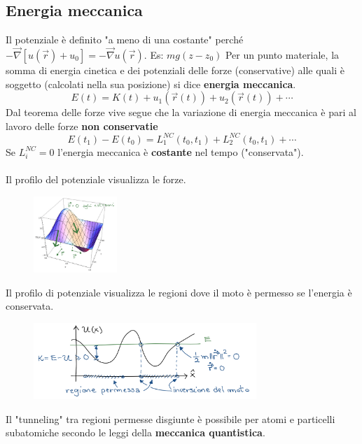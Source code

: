 \subsection{Energia meccanica}
\hspace{-15pt}Il potenziale è definito "a meno di una costante" perché $-\vec{\nabla}[u(\vec{r}) + u_0] = -\vec{\nabla}u(\vec{r})$. Es: $mg(z-z_0)$
Per un punto materiale, la somma di energia cinetica e dei potenziali delle forze (conservative) alle quali è soggetto (calcolati nella sua posizione) si 
dice \textbf{energia meccanica}.
$$E(t) = K(t) + u_1(\vec{r}(t)) + u_2(\vec{r}(t)) + \cdots$$
Dal teorema delle forze vive segue che la variazione di energia meccanica è pari al lavoro delle forze \textbf{non conservatie}
$$E(t_1) - E(t_0) = L_1^{NC}(t_0, t_1) + L_2^{NC}(t_0, t_1) + \cdots$$
Se $L_i^{NC} = 0$ l'energia meccanica è \textbf{costante} nel tempo ("conservata").\\\\
Il profilo del potenziale visualizza le forze.
\begin{figure}[h!]
    \centering
    \includegraphics[width=0.28\textwidth]{images/profilo-potenziale.png}
\end{figure}
\newpage
Il profilo di potenziale visualizza le regioni dove il moto è permesso se l'energia è conservata.
\begin{figure}[h!]
    \centering
    \includegraphics[width=0.75\textwidth]{images/regioni-permesse-profilo-potenziale.png}
\end{figure}
\begin{observation}
    Il "tunneling" tra regioni permesse disgiunte è possibile per atomi e particelli subatomiche secondo
    le leggi della \textbf{meccanica quantistica}.
\end{observation}
